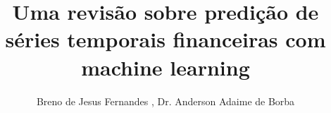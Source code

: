 
\sloppy

\title{Uma revisão sobre predição de séries temporais financeiras com machine learning}

\author{Breno de Jesus Fernandes , Dr. Anderson Adaime de Borba}

\address{
	Ciência da Computação\\
	Faculdade de Computação e Informática\\
	Universidade Presbiteriana Mackenzie\\
	São Paulo -- SP -- Brasil
}
